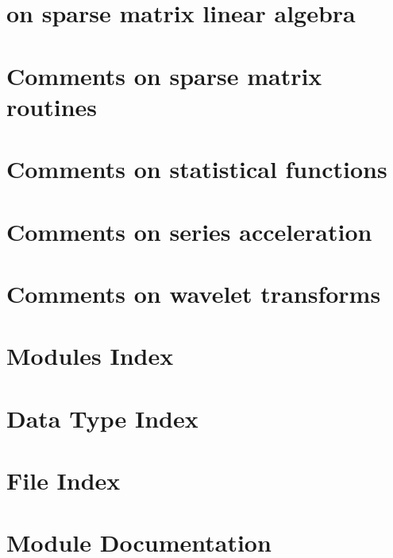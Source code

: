 \documentclass[twoside]{book}
\newcommand{\+}{\discretionary{\mbox{\scriptsize$\hookleftarrow$}}{}{}}
\begin{document}
\chapter{on sparse matrix linear algebra}
\label{Comments}
\hypertarget{Comments}{}

\chapter{Comments on sparse matrix routines}
\label{Comments_01on_01sparse_01matrix_01routines}
\hypertarget{Comments_01on_01sparse_01matrix_01routines}{}

\chapter{Comments on statistical functions}
\label{Comments_01on_01statistical_01functions}
\hypertarget{Comments_01on_01statistical_01functions}{}

\chapter{Comments on series acceleration}
\label{Comments_01on_01series_01acceleration}
\hypertarget{Comments_01on_01series_01acceleration}{}

\chapter{Comments on wavelet transforms}
\label{Comments_01on_01wavelet_01transforms}
\hypertarget{Comments_01on_01wavelet_01transforms}{}

\chapter{Modules Index}

\chapter{Data Type Index}

\chapter{File Index}

\chapter{Module Documentation}

\end{document}
